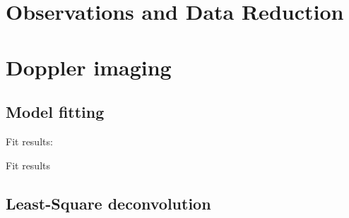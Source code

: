 \documentclass[twocolumn]{aastex631}
\begin{document}
\section{Observations and Data Reduction}

\section{Doppler imaging}

\subsection{Model fitting}

Fit results:
\begin{table*}[ht!]
    \centering
    \caption{Fit results}
    \label{tab:my_table}
\end{table*}

\iffalse
\begin{figure*}[ht!]
    \script{fit.py}
    \begin{centering}
        \texttt{[image: figures/fit.pdf]}
        \caption{
            Plot showing a bunch of random numbers.
        }
        \label{fig:fit}
    \end{centering}
\end{figure*}

\begin{figure*}[ht!]
    \script{fit.py}
    \begin{centering}
    \begin{minipage}[b]{0.48\textwidth}
        \centering
        \texttt{[image: figures/fit\_vsini.pdf]}
        \label{fig:fit_vsini}
    \end{minipage}
    \hfill
    \begin{minipage}[b]{0.48\textwidth}
        \centering
        \texttt{[image: figures/fit\_rv.pdf]}
        \label{fig:fit_rv}
    \end{minipage}
    \end{centering}
\end{figure*}
\fi

\subsection{Least-Square deconvolution}
\end{document}
